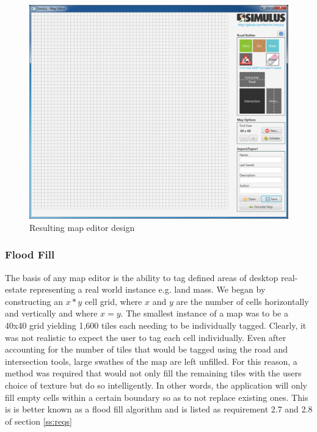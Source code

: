 \begin{figure}[h]
	\begin{center}
			\includegraphics[scale=0.45]{img/mapEditorFinal.png}
		\caption{Resulting map editor design}
		\label{fig:finalMapEditor}
	\end{center}
\end{figure}

\subsubsection{Flood Fill}
The basis of any map editor is the ability to tag defined areas of desktop real-estate representing a real world instance e.g. land mass. We began by constructing an $x*y$ cell grid, where $x$ and $y$ are the number of cells horizontally and vertically and where $x=y$. The smallest instance of a map was to be a 40x40 grid yielding 1,600 tiles each needing to be individually tagged. Clearly, it was not realistic to expect the user to tag each cell individually. Even after accounting for the number of tiles that would be tagged using the road and intersection tools, large swathes of the map are left unfilled.  
For this reason, a method was required that would not only fill the remaining tiles with the users choice of texture but do so intelligently. In other words, the application will only fill empty cells within a certain boundary so as to not replace existing ones. This is is better known as a flood fill algorithm and is listed as requirement 2.7 and 2.8 of section \ref{ss:reqs}

